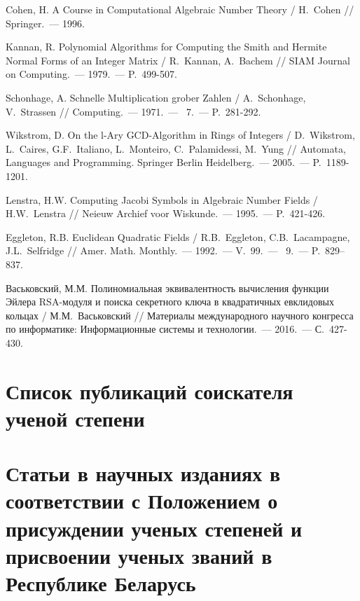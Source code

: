\documentclass[_00_dissertation.tex]{subfiles}
\begin{document}
\begin{thebibliography}{99}
    Cohen, H. A Course in Computational Algebraic Number Theory / H.~Cohen // Springer.~--- 1996.

    Kannan, R. Polynomial Algorithms for Computing the Smith and Hermite Normal Forms of an Integer Matrix / R.~Kannan, A.~Bachem // SIAM Journal on Computing.~--- 1979.~--- P.~499-507.

    Schonhage, A. Schnelle Multiplication grober Zahlen / A.~Schonhage, V.~Strassen // Computing.~--- 1971.~--- \textnumero~7.~--- P.~281-292.

    Wikstrom, D. On the l-Ary GCD-Algorithm in Rings of Integers / D.~Wikstrom, L.~Caires, G.F.~Italiano, L.~Monteiro, C.~Palamidessi, M.~Yung // Automata, Languages and Programming. Springer Berlin Heidelberg.~--- 2005.~--- P.~1189-1201.

    Lenstra, H.W. Computing Jacobi Symbols in Algebraic Number Fields / H.W.~Lenstra // Neieuw Archief voor Wiskunde.~--- 1995.~--- P.~421-426.

    Eggleton, R.B. Euclidean Quadratic Fields / R.B.~Eggleton, C.B.~Lacampagne, J.L.~Selfridge // Amer. Math. Monthly.~--- 1992.~--- V.~99.~--- \textnumero~9.~--- P.~829--837.

    Васьковский, М.М. Полиномиальная эквивалентность вычисления функции Эйлера RSA-модуля и поиска секретного ключа в квадратичных евклидовых кольцах / М.М.~Васьковский // Материалы международного научного конгресса по информатике: Информационные системы и технологии.~--- 2016.~--- С.~427-430.

\end{thebibliography}

\newpage
\section*{Список публикаций соискателя ученой степени}

\renewcommand{\labelenumi}{\arabic{enumi}--A}
\renewcommand{\theenumi}{\arabic{enumi}--A}

\vspace{-4ex}
\section*{\fontsize{14}{15}\selectfont Статьи в научных изданиях в соответствии с Положением о присуждении ученых степеней и присвоении ученых званий в Республике Беларусь}
\vspace{-4ex}
\end{document}
